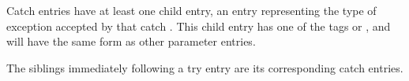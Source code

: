Catch  entries have at 
least one child entry, an
entry representing the type of exception accepted by
that catch . 
This child entry has one of 
the 
tags
 or
,
and will have the same form as other parameter entries.

The siblings immediately following 
a try  entry are its
corresponding catch  entries.







